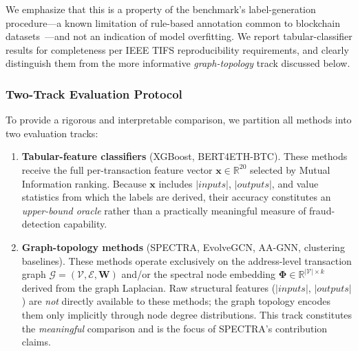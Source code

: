 We emphasize that this is a property of the benchmark's label-generation
procedure---a known limitation of rule-based annotation common to
blockchain datasets~\cite{Jourdan2019,Akcora2022}---and not an indication
of model overfitting.
We report tabular-classifier results for completeness per IEEE TIFS
reproducibility requirements, and clearly distinguish them from the
more informative \emph{graph-topology} track discussed below.

\subsubsection{Two-Track Evaluation Protocol}
To provide a rigorous and interpretable comparison, we partition all methods
into two evaluation tracks:

\begin{enumerate}[leftmargin=*, label=\textbf{T\arabic*}]

  \item \textbf{Tabular-feature classifiers} (XGBoost, BERT4ETH-BTC).
    These methods receive the full per-transaction feature vector
    $\mathbf{x} \in \mathbb{R}^{20}$ selected by Mutual Information ranking.
    Because $\mathbf{x}$ includes $|\mathit{inputs}|$, $|\mathit{outputs}|$,
    and value statistics from which the labels are derived, their accuracy
    constitutes an \emph{upper-bound oracle} rather than a practically
    meaningful measure of fraud-detection capability.

  \item \textbf{Graph-topology methods} (SPECTRA, EvolveGCN, AA-GNN,
    clustering baselines).
    These methods operate exclusively on the address-level transaction graph
    $\mathcal{G} = (\mathcal{V}, \mathcal{E}, \mathbf{W})$ and/or the
    spectral node embedding $\boldsymbol{\Phi} \in \mathbb{R}^{|\mathcal{V}| \times k}$
    derived from the graph Laplacian.
    Raw structural features ($|\mathit{inputs}|$, $|\mathit{outputs}|$) are
    \emph{not} directly available to these methods; the graph topology
    encodes them only implicitly through node degree distributions.
    This track constitutes the \emph{meaningful} comparison and is the
    focus of SPECTRA's contribution claims.

\end{enumerate}

